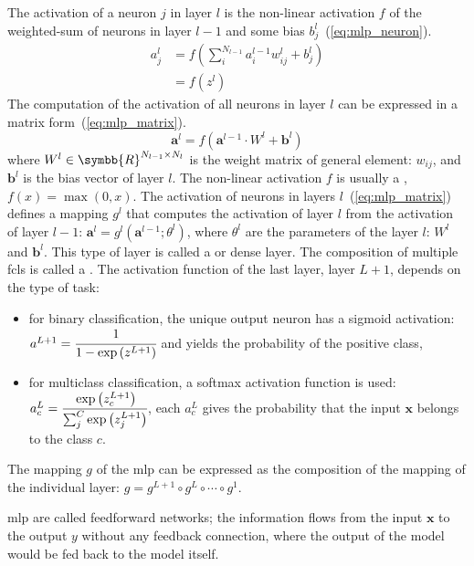 \documentclass[../main.tex]{subfiles}
\begin{document}
		The activation of a neuron \(j\) in layer \(l\) is the non-linear activation \(f\) of the weighted-sum of neurons in layer \(l-1\) and some bias \(b_{j}^{l}\)~(\cref{eq:mlp_neuron}).
		\begin{align}
			a_{j}^{l} & = f\left(\sum_{i}^{N_{l-1}}a_{i}^{l-1}w_{ij}^{l} + b_{j}^{l} \right) \\ \label{eq:mlp_neuron}
			          & = f\left(z^{l}\right)
		\end{align}
		The computation of the activation of all neurons in layer \(l\) can be expressed in a matrix form~(\cref{eq:mlp_matrix}).
		\begin{equation}
			\symbf{a}^{l} = f\left( \symbf{a}^{l-1} \cdot W^l + \symbf{b}^{l} \right) \label{eq:mlp_matrix}
		\end{equation}
		where \(W^l \in \symbb{R}^{N_{l-1} \times N_{l}}\) is the weight matrix of general element: \(w_{ij}\), and \(\symbf{b}^{l}\) is the bias vector of layer \(l\).
		The non-linear activation \(f\) is usually a , \(f\left(x\right) = \max\left(0, x\right)\).
		The activation of neurons in layers \(l\)~(\cref{eq:mlp_matrix}) defines a mapping \(g^{l}\) that computes the activation of layer \(l\) from the activation of layer \(l-1\): \( \symbf{a}^{l} = g^{l}\left(\symbf{a}^{l-1}; \theta^{l}\right)\), where \(\theta^{l}\) are the parameters of the layer \(l\): \(W^l\) and \( \symbf{b}^{l}\).
		This type of layer is called a  or dense layer.
		The composition of multiple \glspl{fcl} is called a .
		The activation function of the last layer, layer \(L+1\), depends on the type of task:
		\begin{itemize}
			\item for binary classification, the unique output neuron has a sigmoid activation: \(a^{L+1} = \cfrac{1}{1-\exp\left(z^{L+1}\right)}\) and yields the probability of the positive class,
			\item for multiclass classification, a softmax activation function is used: \(a_{c}^{L} = \cfrac{\exp\left(z_{c}^{L+1}\right)}{\sum_{j}^{C}\exp\left(z_{j}^{L+1}\right)}\), each \(a_{c}^{L}\) gives the probability that the input \(\symbf{x}\) belongs to the class \(c\).
		\end{itemize}
		The mapping \(g\) of the \gls{mlp} can be expressed as the composition of the mapping of the individual layer: \(g = g^{L+1} \circ g^{L} \circ \cdots \circ g^{1}\).

		\Gls{mlp} are called feedforward networks; the information flows from the input \(\symbf{x}\) to the output \(y\) without any feedback connection, where the output of the model would be fed back to the model itself.
\end{document}
